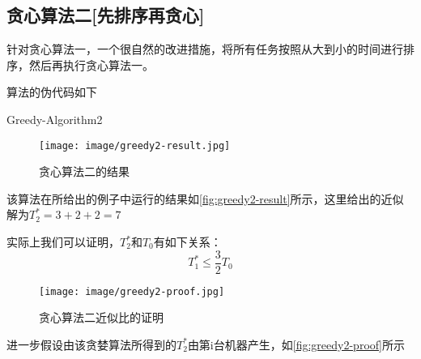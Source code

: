\subsection{贪心算法二[先排序再贪心]}
针对贪心算法一，一个很自然的改进措施，将所有任务按照从大到小的时间进行排序，然后再执行贪心算法一。

算法的伪代码如下

\begin{algorithm}
	\DontPrintSemicolon{}
	\caption{Greedy-Algorithm2}\label{greedy2-algo}
\end{algorithm}

\begin{figure}[hbt]
	\centering
	\texttt{[image: image/greedy2-result.jpg]}
	\caption{贪心算法二的结果}\label{fig:greedy2-result}
\end{figure}
该算法在所给出的例子中运行的结果如\autoref{fig:greedy2-result}所示，这里给出的近似解为$T_2^*=3+2+2=7$

实际上我们可以证明，$T_2^*$和$T_0$有如下关系：
\begin{equation*}
	T_1^*\leq \frac{3}{2} T_0
\end{equation*}

\begin{figure}[hbt]
	\centering
	\texttt{[image: image/greedy2-proof.jpg]}
	\caption{贪心算法二近似比的证明}\label{fig:greedy2-proof}
\end{figure}
进一步假设由该贪婪算法所得到的$T_2^*$由第i台机器产生，如\autoref{fig:greedy2-proof}所示

